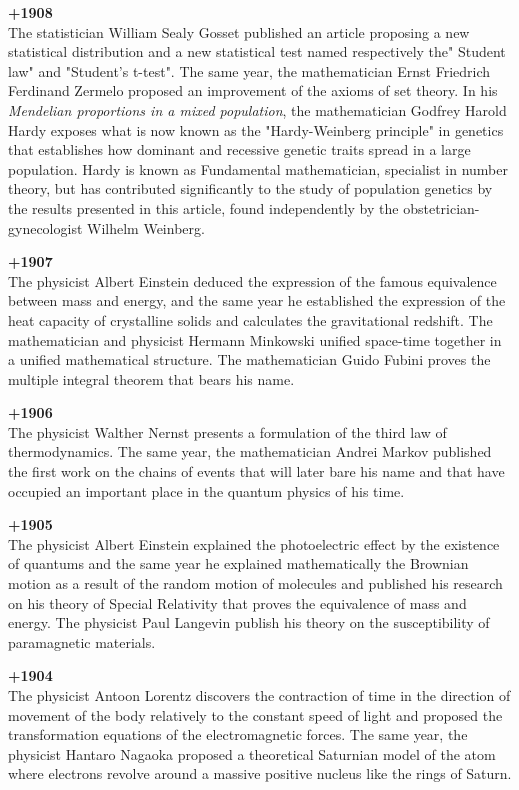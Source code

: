 \textbf{+1908}\\
The statistician William Sealy Gosset published an article proposing a new statistical distribution and a new statistical test named respectively the" Student law" and "Student's t-test". The same year, the mathematician Ernst Friedrich Ferdinand Zermelo proposed an improvement of the axioms of set theory. In his \textit{Mendelian proportions in a mixed population}, the mathematician Godfrey Harold Hardy exposes what is now known as the "Hardy-Weinberg principle" in genetics that establishes how dominant and recessive genetic traits spread in a large population. Hardy is known as Fundamental mathematician, specialist in number theory, but has contributed significantly to the study of population genetics by the results presented in this article, found independently by the obstetrician-gynecologist Wilhelm Weinberg.

\textbf{+1907}\\
The physicist Albert Einstein deduced the expression of the famous equivalence between mass and energy, and the same year he established the expression of the heat capacity of crystalline solids and calculates the gravitational redshift. The mathematician and physicist Hermann Minkowski unified space-time together in a unified mathematical structure. The mathematician Guido Fubini proves the multiple integral theorem that bears his name.

\textbf{+1906}\\
The physicist Walther Nernst presents a formulation of the third law of thermodynamics. The same year, the mathematician Andrei Markov published the first work on the chains of events that will later bare his name and that have occupied an important place in the quantum physics of his time. 

\textbf{+1905}\\
The physicist Albert Einstein explained the photoelectric effect by the existence of quantums and the same year he explained mathematically the Brownian motion as a result of the random motion of molecules and published his research on his theory of Special Relativity that proves the equivalence of mass and energy. The physicist Paul Langevin publish his theory on the susceptibility of paramagnetic materials.

\textbf{+1904}\\
The physicist Antoon Lorentz discovers the contraction of time in the direction of movement of the body relatively to the constant speed of light and proposed the transformation equations of the electromagnetic forces. The same year, the physicist Hantaro Nagaoka proposed a theoretical Saturnian model of the atom where electrons revolve around a massive positive nucleus like the rings of Saturn.

